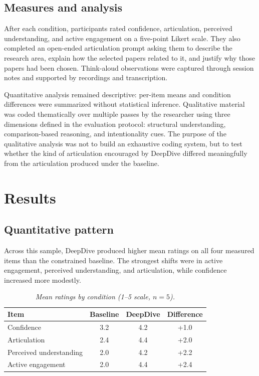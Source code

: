 \documentclass[manuscript,screen]{acmart}
\newcommand{\figcap}[1]{\textit{#1}}
\begin{document}
\subsection{Measures and analysis}
After each condition, participants rated confidence, articulation, perceived understanding, and active engagement on a five-point Likert scale. They also completed an open-ended articulation prompt asking them to describe the research area, explain how the selected papers related to it, and justify why those papers had been chosen. Think-aloud observations were captured through session notes and supported by recordings and transcription.

Quantitative analysis remained descriptive: per-item means and condition differences were summarized without statistical inference. Qualitative material was coded thematically over multiple passes by the researcher using three dimensions defined in the evaluation protocol: structural understanding, comparison-based reasoning, and intentionality cues. The purpose of the qualitative analysis was not to build an exhaustive coding system, but to test whether the kind of articulation encouraged by DeepDive differed meaningfully from the articulation produced under the baseline.

\section{Results}
\subsection{Quantitative pattern}
Across this sample, DeepDive produced higher mean ratings on all four measured items than the constrained baseline. The strongest shifts were in active engagement, perceived understanding, and articulation, while confidence increased more modestly.

\begin{table}[t]
  \caption{\figcap{Mean ratings by condition (1--5 scale, $n=5$).}}
  \label{tab:means}
  \centering
  \begin{tabular}{lccc}
    \toprule
    Item & Baseline & DeepDive & Difference \\
    \midrule
    Confidence & 3.2 & 4.2 & +1.0 \\
    Articulation & 2.4 & 4.4 & +2.0 \\
    Perceived understanding & 2.0 & 4.2 & +2.2 \\
    Active engagement & 2.0 & 4.4 & +2.4 \\
    \bottomrule
  \end{tabular}
\end{table}
\end{document}
